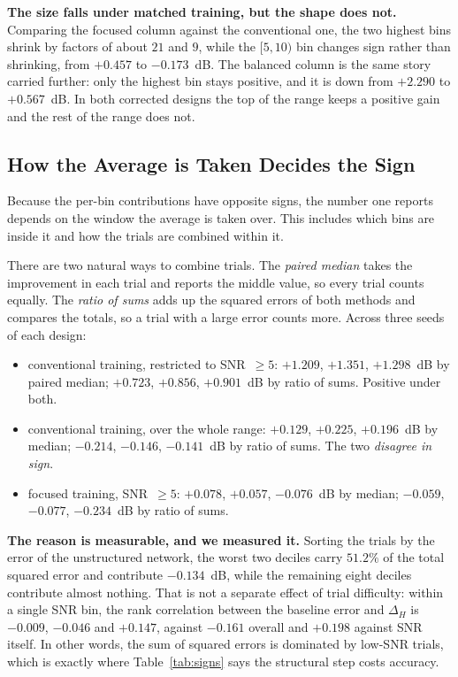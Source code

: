 \documentclass[journal]{IEEEtran}
\begin{document}
\textbf{The size falls under matched training, but the shape does not.}
Comparing the focused column against the conventional one, the two highest bins
shrink by factors of about $21$ and $9$, while the $[5,10)$ bin changes sign
rather than shrinking, from $+0.457$ to $-0.173$~dB. The balanced column is the
same story carried further: only the highest bin stays positive, and it is down
from $+2.290$ to $+0.567$~dB. In both corrected designs the top of the range
keeps a positive gain and the rest of the range does not.

\subsection{How the Average is Taken Decides the Sign}

Because the per-bin contributions have opposite signs, the number one reports
depends on the window the average is taken over. This includes which bins are
inside it and how the trials are combined within it.

There are two natural ways to combine trials. The \emph{paired median} takes
the improvement in each trial and reports the middle value, so every trial
counts equally. The \emph{ratio of sums} adds up the squared errors of both
methods and compares the totals, so a trial with a large error counts more.
Across three seeds of each design:

\begin{itemize}
\item conventional training, restricted to SNR~$\ge5$: $+1.209$, $+1.351$,
$+1.298$~dB by paired median; $+0.723$, $+0.856$, $+0.901$~dB by ratio of sums.
Positive under both.
\item conventional training, over the whole range: $+0.129$, $+0.225$,
$+0.196$~dB by median; $-0.214$, $-0.146$, $-0.141$~dB by ratio of sums. The
two \emph{disagree in sign}.
\item focused training, SNR~$\ge5$: $+0.078$, $+0.057$, $-0.076$~dB by median;
$-0.059$, $-0.077$, $-0.234$~dB by ratio of sums.
\end{itemize}

\textbf{The reason is measurable, and we measured it.} Sorting the trials by
the error of the unstructured network, the worst two deciles carry $51.2\%$ of
the total squared error and contribute $-0.134$~dB, while the remaining eight
deciles contribute almost nothing. That is not a separate effect of trial
difficulty: within a single SNR bin, the rank correlation between the baseline
error and $\Delta_H$ is $-0.009$, $-0.046$ and $+0.147$, against $-0.161$
overall and $+0.198$ against SNR itself. In other words, the sum of squared
errors is dominated by low-SNR trials, which is exactly where
Table~\ref{tab:signs} says the structural step costs accuracy.
\end{document}
